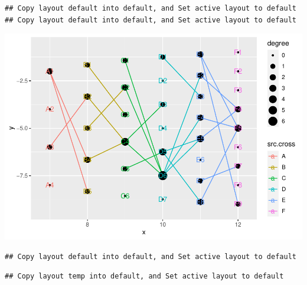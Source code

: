\documentclass[
]{article}
\newenvironment{Shaded}{\begin{snugshade}}{\end{snugshade}}
\newcommand{\CommentTok}[1]{\textcolor[rgb]{0.56,0.35,0.01}{\textit{#1}}}
\newcommand{\KeywordTok}[1]{\textcolor[rgb]{0.13,0.29,0.53}{\textbf{#1}}}
\newcommand{\NormalTok}[1]{#1}
\newcommand{\OperatorTok}[1]{\textcolor[rgb]{0.81,0.36,0.00}{\textbf{#1}}}
\newcommand{\StringTok}[1]{\textcolor[rgb]{0.31,0.60,0.02}{#1}}
\begin{document}
\begin{Shaded}
\end{Shaded}

\begin{verbatim}
## Copy layout default into default, and Set active layout to default
## Copy layout default into default, and Set active layout to default
\end{verbatim}

\includegraphics{ReadMe_files/figure-latex/unnamed-chunk-6-2.pdf}

\begin{Shaded}
\end{Shaded}

\begin{verbatim}
## Copy layout default into default, and Set active layout to default
\end{verbatim}

\begin{verbatim}
## Copy layout temp into default, and Set active layout to default
\end{verbatim}
\end{document}
